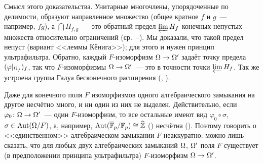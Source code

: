 Смысл этого доказательства. Унитарные многочлены, упорядоченные по делимости, образуют направленное множество (общее
кратное $f$ и $g$~--- например, $fg$), а $\bigcap H_{f,g}$~--- это обратный предел $\varprojlim H_f$ конечных непустых
множеств относительно ограничений (ср.~--). Мы доказали, что такой предел непуст (вариант <<леммы Кёнига>>); для
этого и нужен принцип ультрафильтра. Обратно, каждый $F$-изоморфизм $\Omega\to\Omega'$ задаёт точку предела
$(\varphi|_{\Omega_f})_f$, так что $F$-изоморфизмы $\Omega\to\Omega'$~--- это в точности точки $\varprojlim H_f$. Так же устроена
группа Галуа бесконечного расширения (, ).

\begin{remark}[6.8: предостережение]
Даже для конечного поля $F$ изоморфизмов одного алгебраического замыкания на другое несчётно много, и ни один из них
не выделен. Действительно, если $\varphi_0\colon\Omega\to\Omega'$~--- один $F$-изоморфизм, то все остальные имеют вид
$\varphi_0\circ\sigma$, $\sigma\in\operatorname{Aut}(\Omega/F)$, а, например, $\operatorname{Aut}(\overline{\mathbb F}_p/\mathbb F_p)\cong\widehat{\mathbb Z}$ () несчётна (). Поэтому
говорить о <<единственном>> алгебраическом замыкании $F$ неаккуратно: можно лишь сказать, что для любых двух
алгебраических замыканий $\Omega$, $\Omega'$ поля $F$ существует (в предположении принципа ультрафильтра) $F$-изоморфизм
$\Omega\to\Omega'$.
\end{remark}

